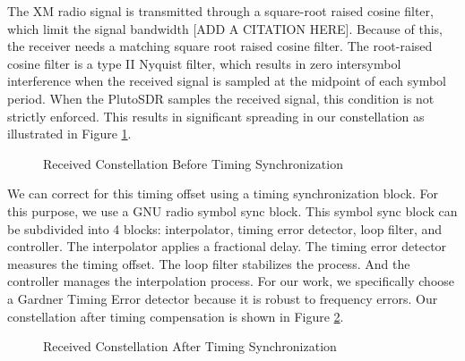 \documentclass[conference,onecolumn]{IEEEtran}
\begin{document}
The XM radio signal is transmitted through a square-root raised cosine filter, which limit the signal bandwidth [ADD A CITATION HERE]. Because of this, the receiver needs a matching square root raised cosine filter. The root-raised cosine filter is a type II Nyquist filter, which results in zero intersymbol interference when the received signal is sampled at the midpoint of each symbol period. When the PlutoSDR samples the received signal, this condition is not strictly enforced. This results in significant spreading in our constellation as illustrated in Figure \ref{fig::constellation_no_timing_comp}.

\begin{figure}[H]
	\centerline{}
	\caption{Received Constellation Before Timing Synchronization}
	\label{fig::constellation_no_timing_comp}
\end{figure}

We can correct for this timing offset using a timing synchronization block. For this purpose, we use a GNU radio symbol sync block. This symbol sync block can be subdivided into 4 blocks: interpolator, timing error detector, loop filter, and controller. The interpolator applies a fractional delay. The timing error detector measures the timing offset. The loop filter stabilizes the process. And the controller manages the interpolation process. For our work, we specifically choose a Gardner Timing Error detector because it is robust to frequency errors. Our constellation after timing compensation is shown in Figure \ref{fig::constellation_after_timing_comp}.

\begin{figure}[H]
	\centerline{}
	\caption{Received Constellation After Timing Synchronization}
	\label{fig::constellation_after_timing_comp}
\end{figure}
\end{document}
